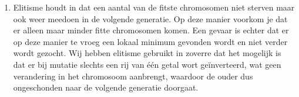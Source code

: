 \documentclass[a4paper,10pt,fleqn]{article}
\begin{document}
\begin{enumerate}[1.]
    \item Elitisme houdt in dat een aantal van de fitste chromosomen niet sterven maar ook weer meedoen in de volgende generatie. Op deze manier voorkom je dat er alleen maar minder fitte chromosomen komen. Een gevaar is echter dat er op deze manier te vroeg een lokaal minimum gevonden wordt en niet verder wordt gezocht. Wij hebben elitisme gebruikt in zoverre dat het mogelijk is dat er bij mutatie slechts een rij van één getal wort geïnverteerd, wat geen verandering in het chromosoom aanbrengt, waardoor de ouder dus ongeschonden naar de volgende generatie doorgaat.

\end{enumerate}
\end{document}
